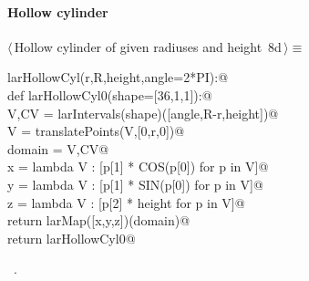 \documentclass[11pt,oneside]{article}	%
\begin{document}
\paragraph{Hollow cylinder}
\begin{flushleft} \small \label{scrap16}
\protect{}$\langle\,$Hollow cylinder of given radiuses and height\nobreak\ {\footnotesize 8d}$\,\rangle\equiv$
\vspace{-1ex}
\begin{list}{}{} \item
\mbox{}\verb@def larHollowCyl(r,R,height,angle=2*PI):@\\
\mbox{}\verb@   def larHollowCyl0(shape=[36,1,1]):@\\
\mbox{}\verb@      V,CV = larIntervals(shape)([angle,R-r,height])@\\
\mbox{}\verb@      V = translatePoints(V,[0,r,0])@\\
\mbox{}\verb@      domain = V,CV@\\
\mbox{}\verb@      x = lambda V : [p[1] * COS(p[0]) for p in V]@\\
\mbox{}\verb@      y = lambda V : [p[1] * SIN(p[0]) for p in V]@\\
\mbox{}\verb@      z = lambda V : [p[2] * height for p in V]@\\
\mbox{}\verb@      return larMap([x,y,z])(domain)@\\
\mbox{}\verb@   return larHollowCyl0@\\
\mbox{}\verb@@{\NWsep}
\end{list}
\vspace{-1ex}
\footnotesize\addtolength{\baselineskip}{-1ex}
\begin{list}{}{\setlength{\itemsep}{-\parsep}\setlength{\itemindent}{-\leftmargin}}
\item \NWtxtMacroRefIn\ .
\end{list}
\end{flushleft}
\end{document}
